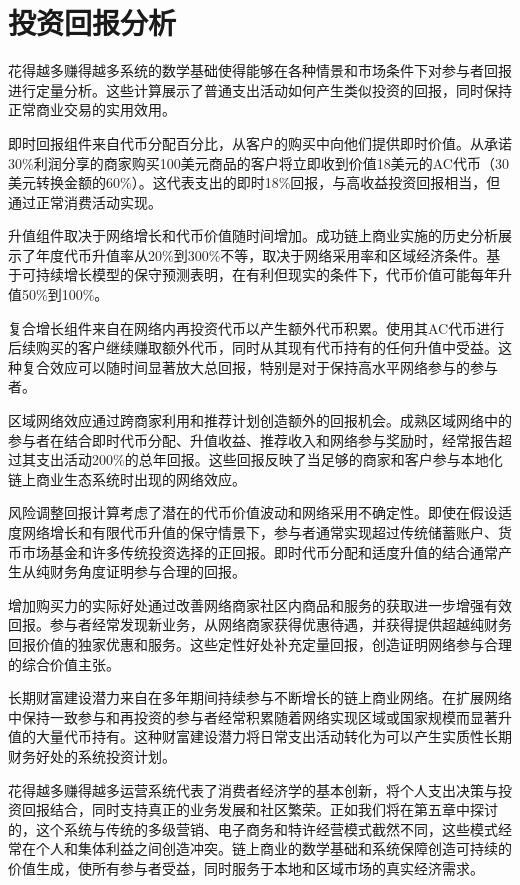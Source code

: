 \documentclass[
  Letterpaper,
]{scrbook}
\begin{document}
\section{投资回报分析}\label{ux6295ux8d44ux56deux62a5ux5206ux6790}

花得越多赚得越多系统的数学基础使得能够在各种情景和市场条件下对参与者回报进行定量分析。这些计算展示了普通支出活动如何产生类似投资的回报，同时保持正常商业交易的实用效用。

即时回报组件来自代币分配百分比，从客户的购买中向他们提供即时价值。从承诺30\%利润分享的商家购买100美元商品的客户将立即收到价值18美元的AC代币（30美元转换金额的60\%）。这代表支出的即时18\%回报，与高收益投资回报相当，但通过正常消费活动实现。

升值组件取决于网络增长和代币价值随时间增加。成功链上商业实施的历史分析展示了年度代币升值率从20\%到300\%不等，取决于网络采用率和区域经济条件。基于可持续增长模型的保守预测表明，在有利但现实的条件下，代币价值可能每年升值50\%到100\%。

复合增长组件来自在网络内再投资代币以产生额外代币积累。使用其AC代币进行后续购买的客户继续赚取额外代币，同时从其现有代币持有的任何升值中受益。这种复合效应可以随时间显著放大总回报，特别是对于保持高水平网络参与的参与者。

区域网络效应通过跨商家利用和推荐计划创造额外的回报机会。成熟区域网络中的参与者在结合即时代币分配、升值收益、推荐收入和网络参与奖励时，经常报告超过其支出活动200\%的总年回报。这些回报反映了当足够的商家和客户参与本地化链上商业生态系统时出现的网络效应。

风险调整回报计算考虑了潜在的代币价值波动和网络采用不确定性。即使在假设适度网络增长和有限代币升值的保守情景下，参与者通常实现超过传统储蓄账户、货币市场基金和许多传统投资选择的正回报。即时代币分配和适度升值的结合通常产生从纯财务角度证明参与合理的回报。

增加购买力的实际好处通过改善网络商家社区内商品和服务的获取进一步增强有效回报。参与者经常发现新业务，从网络商家获得优惠待遇，并获得提供超越纯财务回报价值的独家优惠和服务。这些定性好处补充定量回报，创造证明网络参与合理的综合价值主张。

长期财富建设潜力来自在多年期间持续参与不断增长的链上商业网络。在扩展网络中保持一致参与和再投资的参与者经常积累随着网络实现区域或国家规模而显著升值的大量代币持有。这种财富建设潜力将日常支出活动转化为可以产生实质性长期财务好处的系统投资计划。

花得越多赚得越多运营系统代表了消费者经济学的基本创新，将个人支出决策与投资回报结合，同时支持真正的业务发展和社区繁荣。正如我们将在第五章中探讨的，这个系统与传统的多级营销、电子商务和特许经营模式截然不同，这些模式经常在个人和集体利益之间创造冲突。链上商业的数学基础和系统保障创造可持续的价值生成，使所有参与者受益，同时服务于本地和区域市场的真实经济需求。
\end{document}
